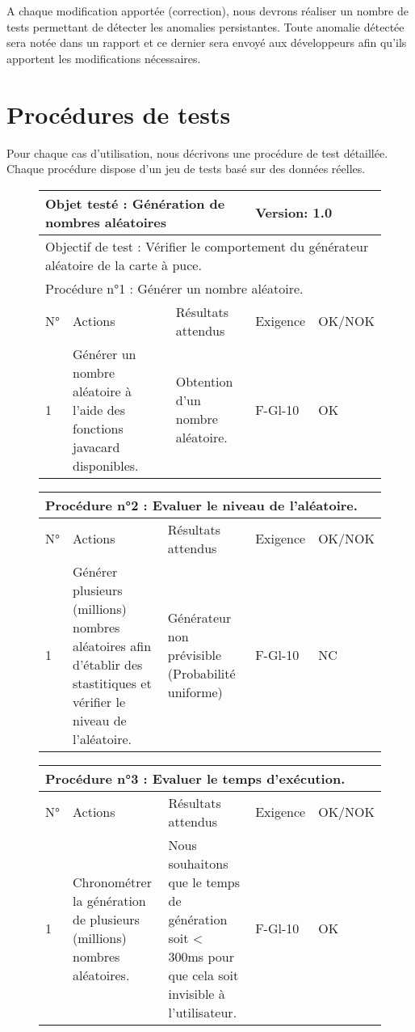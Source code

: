 \documentclass[a4paper,11pt,french]{article}
\begin{document}
A chaque modification apportée (correction), nous devrons réaliser un nombre
de tests permettant de détecter les anomalies persistantes. Toute anomalie
détectée sera notée dans un rapport et ce dernier sera envoyé aux
développeurs afin qu'ils apportent les modifications nécessaires.

\section{Procédures de tests}
Pour chaque cas d’utilisation, nous décrivons une procédure de test
détaillée. Chaque procédure dispose d'un jeu de tests basé sur des
données réelles.


\begin{figure}[!h]
\begin{tabular}{|p{1cm}|p{5cm}|p{5cm}|p{2cm}|p{2cm}|}
\hline
\multicolumn{3}{|l|}{Objet testé : Génération de nombres aléatoires} & \multicolumn{2}{|l|}{Version: 1.0} \\
\hline
\multicolumn{5}{|l|}{Objectif de test : Vérifier le comportement du générateur aléatoire de la carte à puce.} \\
\hline
\multicolumn{5}{|l|}{Procédure n°1 : Générer un nombre aléatoire.} \\
\hline
N° & Actions & Résultats attendus & Exigence & OK/NOK \\
\hline
1 & Générer un nombre aléatoire à l'aide des fonctions javacard disponibles. & Obtention d'un nombre aléatoire. & F-Gl-10 & OK \\
\hline
\end{tabular}
\end{figure}


\begin{figure}[!h]
\begin{tabular}{|p{1cm}|p{5cm}|p{5cm}|p{2cm}|p{2cm}|}
\hline
\multicolumn{5}{|l|}{Procédure n°2 : Evaluer le niveau de l'aléatoire.} \\
\hline
N° & Actions & Résultats attendus & Exigence & OK/NOK \\
\hline
1 & Générer plusieurs (millions) nombres aléatoires afin d'établir des stastitiques et vérifier le niveau de l'aléatoire. &
Générateur non prévisible (Probabilité uniforme) & F-Gl-10 & NC \\
\hline
\end{tabular}
\end{figure}



\begin{figure}[!h]
\begin{tabular}{|p{1cm}|p{5cm}|p{5cm}|p{2cm}|p{2cm}|}
\hline
\multicolumn{5}{|l|}{Procédure n°3 : Evaluer le temps d'exécution.} \\
\hline
N° & Actions & Résultats attendus & Exigence & OK/NOK \\
\hline
1 & Chronométrer la génération de plusieurs (millions) nombres aléatoires. & Nous souhaitons que le temps de génération soit < 300ms pour que cela soit invisible à l'utilisateur. & F-Gl-10 & OK \\
\hline
\end{tabular}
\end{figure}
\end{document}
